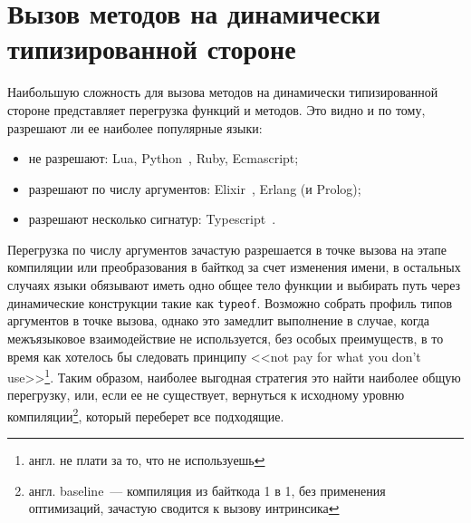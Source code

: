 \documentclass[times
,titlepage
]{itmo-student-thesis}
\begin{document}
\section{Вызов методов на динамически типизированной стороне}
Наибольшую сложность для вызова методов на динамически типизированной стороне представляет перегрузка функций и методов. Это видно и по тому, разрешают ли ее наиболее популярные языки:
\begin{itemize}
	\item не разрешают: Lua, Python~\cite{overload-python}, Ruby, Ecmascript;
	\item разрешают по числу аргументов: Elixir~\cite{overload-elixir}, Erlang (и Prolog);
	\item разрешают несколько сигнатур: Typescript~\cite{overload-typescript}.
\end{itemize}
Перегрузка по числу аргументов зачастую разрешается в точке вызова на этапе компиляции или преобразования в байткод за счет изменения имени, в остальных случаях языки обязывают иметь одно общее тело функции и выбирать путь через динамические конструкции такие как \texttt{typeof}. Возможно собрать профиль типов аргументов в точке вызова, однако это замедлит выполнение в случае, когда межъязыковое взаимодействие не используется, без особых преимуществ, в то время как хотелось бы следовать принципу <<not pay for what you don't use>>\footnote{англ. не плати за то, что не используешь}. Таким образом, наиболее выгодная стратегия это найти наиболее общую перегрузку, или, если ее не существует, вернуться к исходному уровню компиляции\footnote{англ. baseline~--- компиляция из байткода 1 в 1, без применения оптимизаций, зачастую сводится к вызову интринсика}, который переберет все подходящие.
\end{document}

